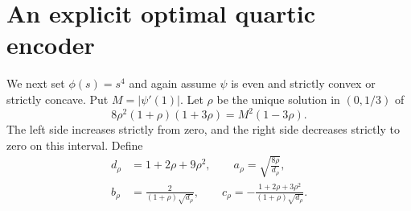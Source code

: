 \documentclass[11pt,letterpaper]{article}
\theoremstyle{remark}
\begin{document}
\section{An explicit optimal quartic encoder}
We next set $\phi(s)=s^4$ and again assume $\psi$ is even and strictly convex or strictly concave. Put $M=|\psi'(1)|$. Let $\rho$ be the unique solution in $(0,1/3)$ of
\begin{equation}
 8\rho^2(1+\rho)(1+3\rho)=M^2(1-3\rho).
 \label{eq:quarticroot}
\end{equation}
The left side increases strictly from zero, and the right side decreases strictly to zero on this interval. Define
\begin{equation}
\begin{aligned}
 d_\rho&=1+2\rho+9\rho^2,\qquad
 a_\rho=\sqrt{\frac{8\rho}{d_\rho}},\\
 b_\rho&=\frac{2}{(1+\rho)\sqrt{d_\rho}},\qquad
 c_\rho=-\frac{1+2\rho+3\rho^2}{(1+\rho)\sqrt{d_\rho}}.
\end{aligned}
\label{eq:quarticcoefficients}
\end{equation}
\end{document}
